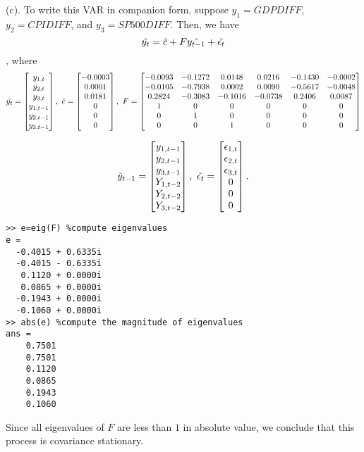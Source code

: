 \documentclass[11pt]{article}
\begin{document}
\bigskip
(c). To write this VAR in companion form, suppose $y_{1}=GDPDIFF$, $y_{2}=CPIDIFF$, and $y_{3}=SP500DIFF$. Then, we have
$$\Tilde{y_t}=\Tilde{c}+F\Tilde{y_{t-1}}+\Tilde{\epsilon_t}$$, where
\[
\Tilde{y_t}
=
\begin{bmatrix}
y_{1,t}\\
y_{2,t}\\
y_{3,t}\\
y_{1,t-1}\\
y_{2,t-1}\\
y_{3,t-1}\\
\end{bmatrix}
,\ \Tilde{c}
=
\begin{bmatrix}
-0.0003\\
0.0001\\
0.0181\\
0\\
0\\
0
\end{bmatrix}
,\ F
=
\begin{bmatrix}
-0.0093 &-0.1272 &0.0148 &0.0216 &-0.1430 &-0.0002\\
-0.0105 &-0.7938 &0.0002 &0.0090 &-0.5617 &-0.0048\\
0.2824 &-0.3083 &-0.1016 &-0.0738 &0.2406 &0.0087\\
1 &0 &0 &0 &0 &0\\
0 &1 &0 &0 &0 &0\\
0 &0 &1 &0 &0 &0
\end{bmatrix}
\]

\[
\Tilde{y}_{t-1}
=
\begin{bmatrix}
y_{1,t-1}\\
y_{2,t-1}\\
y_{3,t-1}\\
Y_{1,t-2}\\
Y_{2,t-2}\\
Y_{3,t-2}
\end{bmatrix}
,\ \Tilde{\epsilon_t}
=
\begin{bmatrix}
\epsilon_{1,t}\\
\epsilon_{2,t}\\
\epsilon_{3,t}\\
0\\
0\\
0
\end{bmatrix}.
\]
\begin{lstlisting}
>> e=eig(F) %compute eigenvalues
e =
  -0.4015 + 0.6335i
  -0.4015 - 0.6335i
   0.1120 + 0.0000i
   0.0865 + 0.0000i
  -0.1943 + 0.0000i
  -0.1060 + 0.0000i
>> abs(e) %compute the magnitude of eigenvalues
ans =
    0.7501
    0.7501
    0.1120
    0.0865
    0.1943
    0.1060
\end{lstlisting}
Since all eigenvalues of $F$ are less than $1$ in absolute value, we conclude that this process is covariance stationary.
\end{document}
